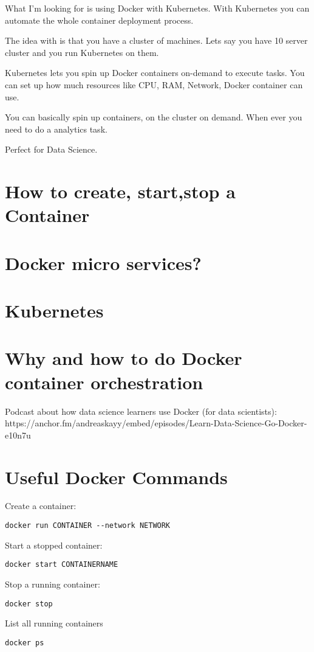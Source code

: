 \documentclass[12pt, numbers=noenddot]{scrreprt} %
\begin{document}
What I’m looking for is using Docker with Kubernetes. With Kubernetes you can automate the whole container deployment process.

The idea with is that you have a cluster of machines. Lets say you have 10 server cluster and you run Kubernetes on them.

Kubernetes lets you spin up Docker containers on-demand to execute tasks. You can set up how much resources like CPU, RAM, Network, Docker container can use.

You can basically spin up containers, on the cluster on demand. When ever you need to do a analytics task.

Perfect for Data Science.
\section{How to create, start,stop a Container}
\section{Docker micro services?}
\section{Kubernetes}
\section{Why and how to do Docker container orchestration}
Podcast about how data science learners use Docker (for data scientists): https://anchor.fm/andreaskayy/embed/episodes/Learn-Data-Science-Go-Docker-e10n7u

\section{Useful Docker Commands}

Create a container:
\begin{lstlisting}
docker run CONTAINER --network NETWORK
\end{lstlisting}

Start a stopped container:
\begin{lstlisting}
docker start CONTAINERNAME 
\end{lstlisting}

Stop a running container:
\begin{lstlisting}
docker stop
\end{lstlisting}

List all running containers
\begin{lstlisting}
docker ps
\end{lstlisting}
\end{document}
